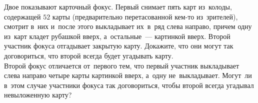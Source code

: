\begin{problems}
\item
\subproblem
Двое показывают карточный фокус.
Первый снимает пять карт из~колоды, содержащей $52$ карты (предварительно
перетасованной кем-то из~зрителей), смотрит в~них и~после этого выкладывает
их~в~ряд слева направо, причем одну из~карт кладет рубашкой вверх,
а~остальные~--- картинкой вверх.
Второй участник фокуса отгадывает закрытую карту.
Докажите, что они могут так договориться, что второй всегда будет угадывать
карту.
\\
\subproblem
Второй фокус отличается от~первого тем, что первый участник выкладывает слева
направо четыре карты картинкой вверх, а~одну не~выкладывает.
Могут~ли в~этом случае участники фокуса так договориться, чтобы второй всегда
угадывал невыложенную карту?

\end{problems}

